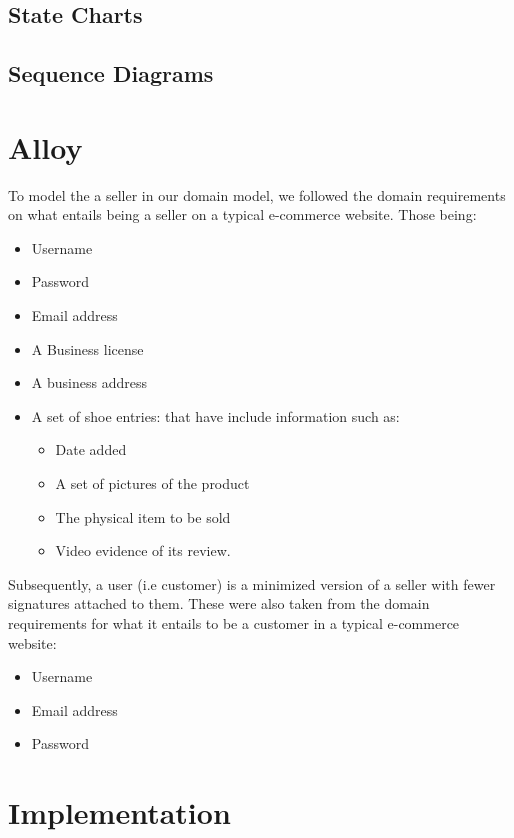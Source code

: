 \subsection{State Charts}

\subsection{Sequence Diagrams}
\section{Alloy}
To model the a seller in our domain model, we followed the domain requirements on what entails being a seller on a typical e-commerce website. Those being:
\begin{itemize}
  \item Username
  \item Password
  \item Email address
  \item A Business license
  \item A business address
  \item A set of shoe entries: that have include information such as:
  \begin{itemize}
    \item Date added
    \item A set of pictures of the product
    \item The physical item to be sold
    \item Video evidence of its review.
  \end{itemize}
\end{itemize}
Subsequently, a user (i.e customer) is a minimized version of a seller with fewer signatures attached to them. These were also taken from the domain requirements for what it entails to be a customer in a typical e-commerce website:
\begin{itemize}
  \item Username
  \item Email address
  \item Password
\end{itemize}
\section{Implementation}
